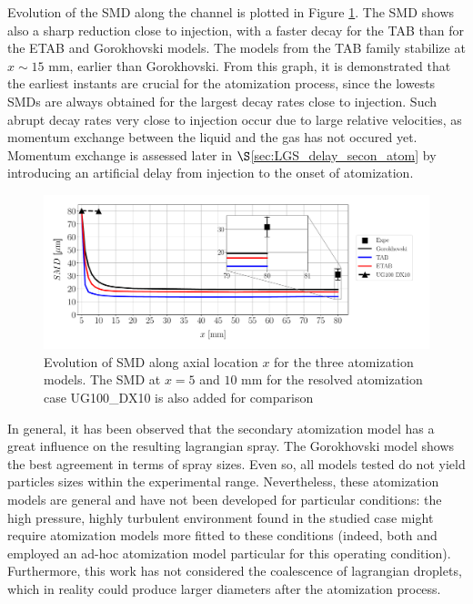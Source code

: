 Evolution of the SMD along the channel is plotted in Figure \ref{fig:SMD_vs_x_param_breakup_model}. The SMD shows also a sharp reduction close to injection, with a faster decay for the TAB than for the ETAB and Gorokhovski models. The models from the TAB family stabilize at $x \sim 15$ mm, earlier than Gorokhovski. From this graph, it is demonstrated that the earliest instants are crucial for the atomization process, since the lowests SMDs are always obtained for the largest decay rates close to injection. Such abrupt decay rates very close to injection occur due to large relative velocities, as momentum exchange between the liquid and the gas has not occured yet. Momentum exchange is assessed later in $\S$\ref{sec:LGS_delay_secon_atom} by introducing an artificial delay from injection to the onset of atomization.


\begin{figure}[h!]
\centering
\includegraphics[scale=0.475]{./part2_developments/figures_ch6_lagrangian_JICF/params_breakup_model/SMD_vs_x_breakup_models_comparison}
\vspace*{-0.4in}
\caption[Evolution of SMD along axial location $x$ for the three atomization models]{Evolution of SMD along axial location $x$ for the three atomization models. The SMD at $x = 5$ and $10$ mm for the resolved atomization case UG100\_DX10 is also added for comparison}
\label{fig:SMD_vs_x_param_breakup_model}
\end{figure}

In general, it has been observed that the secondary atomization model has a great influence on the resulting lagrangian spray. The Gorokhovski model shows the best agreement in terms of spray sizes. Even so, all models tested do not yield particles sizes within the experimental range.  Nevertheless, these atomization models are general and have not been developed for particular conditions: the high pressure, highly turbulent environment found in the studied case might require atomization models more fitted to these conditions (indeed, both  and  employed an ad-hoc atomization model particular for this operating condition). Furthermore, this work has not considered the coalescence of lagrangian droplets, which in reality could produce larger diameters after the atomization process.









